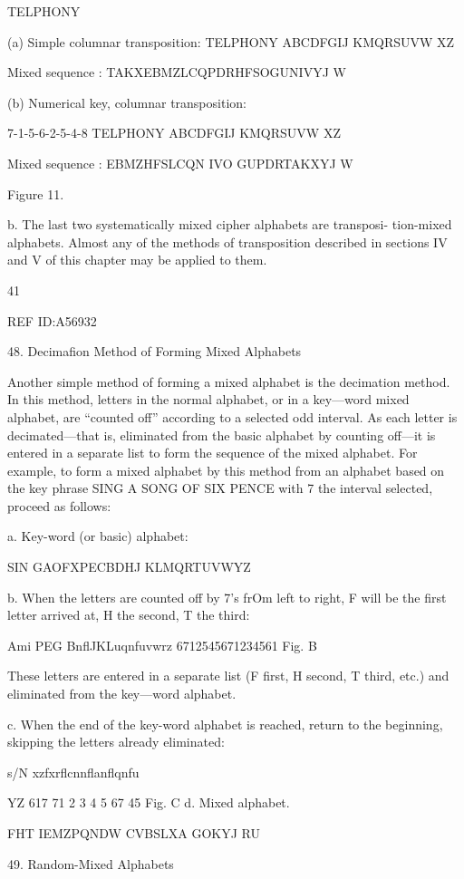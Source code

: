 {{TELPHONY

(a) Simple columnar transposition:
TELPHONY
ABCDFGIJ
KMQRSUVW
XZ

Mixed sequence :
TAKXEBMZLCQPDRHFSOGUNIVYJ W

(b) Numerical key, columnar transposition:

7-1-5-6-2-5-4-8
TELPHONY
ABCDFGIJ
KMQRSUVW
XZ

Mixed sequence :
EBMZHFSLCQN IVO GUPDRTAKXYJ W

Figure 11.

b. The last two systematically mixed cipher alphabets are transposi-
tion-mixed alphabets. Almost any of the methods of transposition
described in sections IV and V of this chapter may be applied to them.

41

 

REF ID:A56932

48. Decimaﬁon Method of Forming Mixed Alphabets

Another simple method of forming a mixed alphabet is the decimation
method. In this method, letters in the normal alphabet, or in a key—word
mixed alphabet, are “counted off” according to a selected odd interval.
As each letter is decimated—that is, eliminated from the basic alphabet
by counting off—it is entered in a separate list to form the sequence of
the mixed alphabet. For example, to form a mixed alphabet by this
method from an alphabet based on the key phrase SING A SONG OF
SIX PENCE with 7 the interval selected, proceed as follows:

a. Key-word (or basic) alphabet:

SIN GAOFXPECBDHJ KLMQRTUVWYZ

b. When the letters are counted off by 7’s frOm left to right, F will
be the ﬁrst letter arrived at, H the second, T the third:

Ami PEG BnﬂJKLuqnfuvwrz
6712545671234561
Fig. B

These letters are entered in a separate list (F ﬁrst, H second, T third,
etc.) and eliminated from the key—word alphabet.

c. When the end of the key-word alphabet is reached, return to the
beginning, skipping the letters already eliminated:

s/N xzfxrﬂcnnﬂanﬂqnfu

YZ
617 71 2 3 4 5 67 45
Fig. C
d. Mixed alphabet.

FHT IEMZPQNDW CVBSLXA GOKYJ RU

49. Random-Mixed Alphabets

}}
